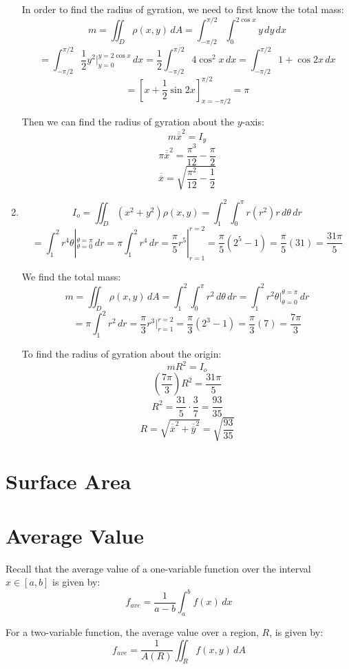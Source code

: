 \begin{Answer}[ref = moment]
\begin{enumerate}
In order to find the radius of gyration, we need to first know the total mass:
$$m = \iint_{\textit{D}} \rho(x, y)\,dA = \int_{-\pi/2}^{\pi/2} \int_{0}^{2
\cos{x}} y \,dy\,dx$$
$$= \int_{-\pi/2}^{\pi/2} \frac{1}{2}y^2|_{y = 0}^{y = 2\cos{x}}\,dx = 
\frac{1}{2} \int_{-\pi/2}^{\pi/2} 4\cos^2{x}\,dx = \int_{-\pi/2}^{\pi/2} 1 + 
\cos{2x}\,dx$$
$$= \left[x + \frac{1}{2}\sin{2x} \right]_{x = -\pi/2}^{\pi/2} = \pi$$

Then we can find the radius of gyration about the $y$-axis:
$$m \overline{\overline{x}}^2 = I_y$$
$$\pi \overline{\overline{x}}^2 = \frac{\pi^3}{12} - \frac{\pi}{2}$$
$$\overline{\overline{x}} = \sqrt{\frac{\pi^2}{12} - \frac{1}{2}}$$

\item $$I_o = \iint_{\textit{D}} \left( x^2 + y^2 \right) \rho(x, y) = \int_1^2
\int_0^{\pi} r (r^2) r \,d\theta \,dr$$
$$= \int_1^2 r^4 \theta|_{\theta = 0}^{\theta = \pi}\,dr = \pi \int_1^2 r^4\,dr
= \frac{\pi}{5} r^5|_{r = 1}^{r = 2} = \frac{\pi}{5} \left(2^5 - 1 \right) = 
\frac{\pi}{5} (31) = \frac{31\pi}{5}$$

We find the total mass:
$$m = \iint_{\textit{D}} \rho(x,y)\,dA = \int_1^2 \int_0^{\pi} r^2\,d\theta\,dr
= \int_1^2 r^2 \theta|_{\theta = 0}^{\theta = \pi}\,dr$$
$$= \pi \int_1^2 r^2\,dr = \frac{\pi}{3} r^3|_{r = 1}^{r = 2} = \frac{\pi}{3} 
\left(2^3 - 1 \right) = \frac{\pi}{3}(7) = \frac{7\pi}{3}$$

To find the radius of gyration about the origin:
$$mR^2 = I_o$$
$$\left( \frac{7\pi}{3} \right) R^2 = \frac{31\pi}{5}$$
$$R^2 = \frac{31}{5} \cdot \frac{3}{7} = \frac{93}{35}$$
$$R = \sqrt{\overline{\overline{x}}^2 + \overline{\overline{y}}^2} = \sqrt{
\frac{93}{35}}$$
\end{enumerate}
\end{Answer}

\section{Surface Area}

\section{Average Value}
Recall that the average value of a one-variable function over the interval $x 
\in [a, b]$ is given by:
$$f_{ave} = \frac{1}{a - b}\int_a^b f(x)\,dx$$

For a two-variable function, the average value over a region, $R$, is given by:
$$f_{ave} = \frac{1}{A(R)} \iint_{R} f(x, y)\,dA$$

